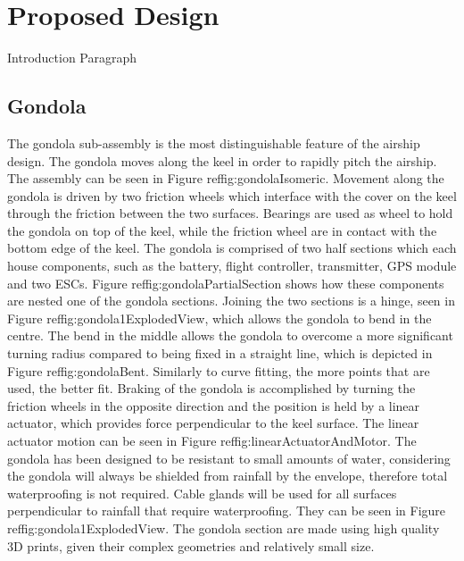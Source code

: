 \documentclass[../main.tex]{subfiles}
\begin{document}
\chapter{Proposed Design}
Introduction Paragraph
\section{Gondola}
The gondola sub-assembly is the most distinguishable feature of the airship design. The gondola moves along the keel in order to rapidly pitch the airship. The assembly can be seen in  Figure ref{fig:gondolaIsomeric}. Movement along the gondola is driven by two friction wheels which interface with the cover on the keel through the friction between the two surfaces. Bearings are used as wheel to hold the gondola on top of the keel, while the friction wheel are in contact with the bottom edge of the keel. The gondola is comprised of two half sections which each house components, such as the battery, flight controller, transmitter, GPS module and two ESCs. Figure ref{fig:gondolaPartialSection} shows how these components are  nested one of the gondola sections. Joining the two sections is a hinge, seen in Figure  ref{fig:gondola1ExplodedView}, which allows the gondola to bend in the centre. The bend in the middle allows the gondola to overcome a more significant turning radius compared to being fixed in a straight line, which is depicted in Figure ref{fig:gondolaBent}. Similarly to curve fitting, the more points that are used, the better fit. Braking of the gondola is accomplished by turning the friction wheels in the opposite direction and the position is held by a linear actuator, which provides force perpendicular to the keel surface. The linear actuator motion can be seen in Figure  ref{fig:linearActuatorAndMotor}. The gondola has been designed to be resistant to small amounts of water, considering the gondola will always be shielded from rainfall by the envelope, therefore total waterproofing is not required. Cable glands will be used for all surfaces perpendicular to rainfall that require waterproofing. They can be seen in Figure ref{fig:gondola1ExplodedView}. The gondola section are made using high quality 3D prints, given their complex geometries and relatively small size.
\\
\end{document}
